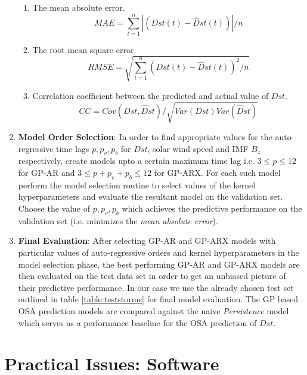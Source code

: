 \documentclass{article}
\begin{document}
\begin{enumerate}
  \begin{enumerate}
  \item The mean absolute error.
    \begin{equation}
      MAE = \sum_{t=1}^{n} \left |(Dst(t) - \hat{D}st(t)) \right | / n
    \end{equation}
  \item The root mean square error.
    \begin{equation}
      RMSE = \sqrt{\sum_{t=1}^{n} (Dst(t) - \hat{D}st(t))^2 / n}
    \end{equation}
  \item Correlation coefficient between the predicted and actual value of $Dst$.
    \begin{equation}
      CC = Cov(Dst, \hat{D}st)/\sqrt{Var(Dst) Var(\hat{D}st)}
    \end{equation}
  \end{enumerate}


\item \textbf{Model Order Selection}: In order to find appropriate
  values for the auto-regressive time lags $p, p_v, p_b$ for $Dst$,
  solar wind speed and IMF $B_z$ respectively, create models upto a
  certain maximum time lag i.e. $3 \leq p \leq 12$ for GP-AR and $3
  \leq p + p_v + p_b \leq 12$ for GP-ARX. For each such model perform
  the model selection routine to select values of the kernel
  hyperparameters and evaluate the resultant model on the validation
  set. Choose the value of $p, p_v, p_b$ which achieves the predictive
  performance on the validation set (i.e. minimizes the \emph{mean
    absolute error}).

\item \textbf{Final Evaluation}: After selecting GP-AR and GP-ARX
  models with particular values of auto-regressive orders and kernel
  hyperparameters in the model selection phase, the best performing
  GP-AR and GP-ARX models are then evaluated on the test data set in
  order to get an unbiased picture of their predictive performance. In
  our case we use the already chosen test set outlined in table
  \ref{table:teststorms} for final model evaluation. The GP based OSA
  prediction models are compared against the naive \emph{Persistence}
  model which serves as a performance baseline for the OSA prediction
  of $Dst$.

\end{enumerate}

\section{Practical Issues: Software}
\end{document}
